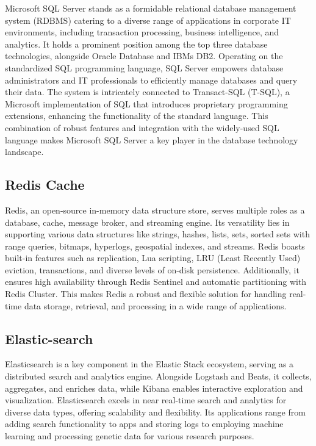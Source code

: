 Microsoft SQL Server stands as a formidable relational database
management system (RDBMS) catering to a diverse range of applications in
corporate IT environments, including transaction processing, business
intelligence, and analytics. It holds a prominent position among the top
three database technologies, alongside Oracle Database and
IBM\textquotesingle s DB2. Operating on the standardized SQL programming
language, SQL Server empowers database administrators and IT
professionals to efficiently manage databases and query their data. The
system is intricately connected to Transact-SQL (T-SQL), a Microsoft
implementation of SQL that introduces proprietary programming
extensions, enhancing the functionality of the standard language. This
combination of robust features and integration with the widely-used SQL
language makes Microsoft SQL Server a key player in the database
technology landscape.


\subsection{Redis Cache}

Redis, an open-source in-memory data structure store, serves multiple
roles as a database, cache, message broker, and streaming engine. Its
versatility lies in supporting various data structures like strings,
hashes, lists, sets, sorted sets with range queries, bitmaps, hyperlogs,
geospatial indexes, and streams. Redis boasts built-in features such as
replication, Lua scripting, LRU (Least Recently Used) eviction,
transactions, and diverse levels of on-disk persistence. Additionally,
it ensures high availability through Redis Sentinel and automatic
partitioning with Redis Cluster. This makes Redis a robust and flexible
solution for handling real-time data storage, retrieval, and processing
in a wide range of applications.


\subsection{Elastic-search}

Elasticsearch is a key component in the Elastic Stack ecosystem, serving
as a distributed search and analytics engine. Alongside Logstash and
Beats, it collects, aggregates, and enriches data, while Kibana enables
interactive exploration and visualization. Elasticsearch excels in near
real-time search and analytics for diverse data types, offering
scalability and flexibility. Its applications range from adding search
functionality to apps and storing logs to employing machine learning and
processing genetic data for various research purposes.

